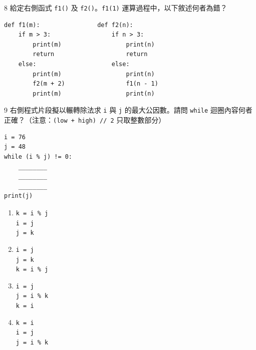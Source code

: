 \medskip

\begin{qbox}{8}
給定右側函式 \texttt{f1()} 及 \texttt{f2()}。\texttt{f1(1)} 運算過程中，以下敘述何者為錯？

\begin{verbatim}
def f1(m):                def f2(n):
    if m > 3:                 if n > 3:
        print(m)                  print(n)
        return                    return
    else:                     else:
        print(m)                  print(n)
        f2(m + 2)                 f1(n - 1)
        print(m)                  print(n)
\end{verbatim}

\end{qbox}

\medskip

\begin{qbox}{9}
右側程式片段擬以輾轉除法求 \texttt{i} 與 \texttt{j} 的最大公因數。請問 \texttt{while} 迴圈內容何者正確？（注意：\texttt{(low + high) // 2} 只取整數部分）

\begin{verbatim}
i = 76
j = 48
while (i % j) != 0:
    ________
    ________
    ________
print(j)
\end{verbatim}

\begin{enumerate}[label=(\Alph*), itemsep=4pt, topsep=1pt, leftmargin=2.2em, parsep=0pt]
  \item \texttt{k = i \% j} \\ \texttt{i = j} \\ \texttt{j = k}
  \item \texttt{i = j} \\ \texttt{j = k} \\ \texttt{k = i \% j}
  \item \texttt{i = j} \\ \texttt{j = i \% k} \\ \texttt{k = i}
  \item \texttt{k = i} \\ \texttt{i = j} \\ \texttt{j = i \% k}
\end{enumerate}
\end{qbox}

